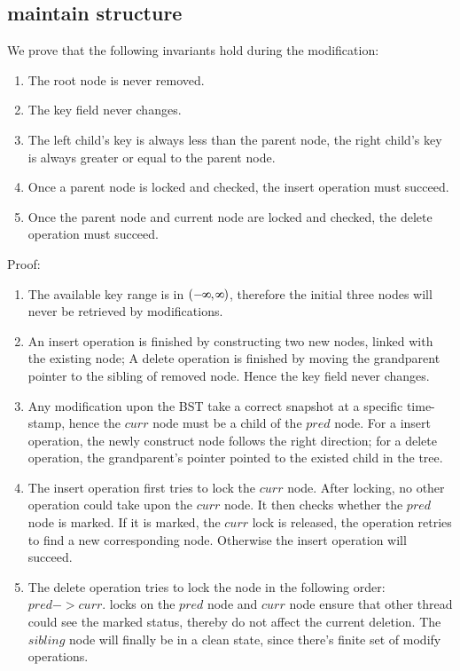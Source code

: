 \documentclass{article}
\def\infinity{\rotatebox{90}{8}}
\begin{document}
\subsection{maintain structure}
We prove that the following invariants hold during the modification:
\begin{enumerate}
\item The root node is never removed.
\item The key field never changes.
\item The left child's key is always less than the parent node, the right child's key is always greater or equal to the parent node.
\item Once a parent node is locked and checked, the insert operation must succeed.
\item Once the parent node and current node are locked and checked, the delete operation must succeed.
\end{enumerate}
Proof:
\begin{enumerate}
\item The available key range is in $(-\infinity, \infinity)$, therefore the initial three nodes will never be retrieved by modifications.
\item An insert operation is finished by constructing two new nodes, linked with the existing node; A delete operation is finished by moving the grandparent pointer to the sibling of removed node. Hence the key field never changes.
\item Any modification upon the BST take a correct snapshot at a specific time-stamp, hence the $curr$ node must be a child of the $pred$ node. For a insert operation, the newly construct node follows the right direction; for a delete operation, the grandparent's pointer pointed to the existed child in the tree.
\item The insert operation first tries to lock the $curr$ node. After locking, no other operation could take upon the $curr$ node. It then checks whether the $pred$ node is marked. If it is marked, the $curr$ lock is released, the operation retries to find a new corresponding node. Otherwise the insert operation will succeed. 
\item The delete operation tries to lock the node in the following order: $pred->curr$. locks on the $pred$ node and $curr$ node ensure that other thread could see the marked status, thereby do not affect the current deletion. The $sibling$ node will finally be in a clean state, since there's finite set of modify operations. 
\end{enumerate}
\end{document}
